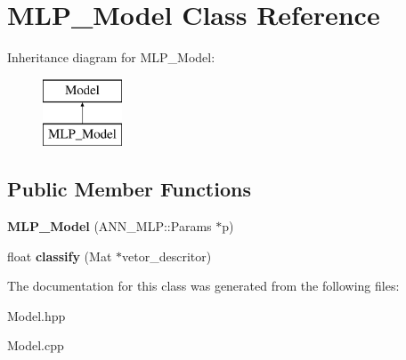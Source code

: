 \hypertarget{class_m_l_p___model}{\section{M\+L\+P\+\_\+\+Model Class Reference}
\label{class_m_l_p___model}
}
Inheritance diagram for M\+L\+P\+\_\+\+Model\+:\begin{figure}[H]
\begin{center}
\leavevmode
\includegraphics[height=2.000000cm]{class_m_l_p___model}
\end{center}
\end{figure}
\subsection*{Public Member Functions}
\begin{DoxyCompactItemize}
\item 
\hypertarget{class_m_l_p___model_a148451157142e1099a49b76960b5c484}{{\bfseries M\+L\+P\+\_\+\+Model} (A\+N\+N\+\_\+\+M\+L\+P\+::\+Params $\ast$p)}\label{class_m_l_p___model_a148451157142e1099a49b76960b5c484}

\item 
\hypertarget{class_m_l_p___model_a44623c14189c926f0fff358608076d33}{float {\bfseries classify} (Mat $\ast$vetor\+\_\+descritor)}\label{class_m_l_p___model_a44623c14189c926f0fff358608076d33}

\end{DoxyCompactItemize}


The documentation for this class was generated from the following files\+:\begin{DoxyCompactItemize}
\item 
Model.\+hpp\item 
Model.\+cpp\end{DoxyCompactItemize}
